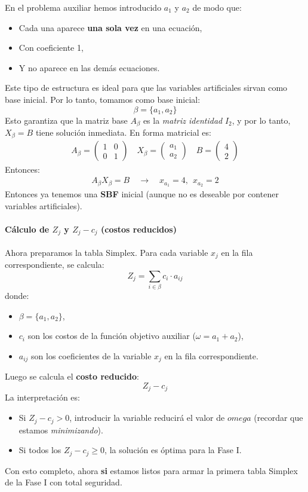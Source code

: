 En el problema auxiliar hemos introducido \(a_1\) y \(a_2\) de modo que:
\begin{itemize}
  \item Cada una aparece \textbf{una sola vez} en una ecuación,
  \item Con coeficiente 1,
  \item Y no aparece en las demás ecuaciones.
\end{itemize}
Este tipo de estructura es ideal para que las variables artificiales sirvan como base inicial. Por lo tanto, tomamos como base inicial:
\[
  \beta = \{a_1, a_2\}
\]
Esto garantiza que la matriz base \(A_\beta\) es la \textit{matriz identidad} \(I_2\), y por lo tanto, \(X_\beta = B\) tiene solución inmediata. En forma matricial es:
\begin{align*}
  A_\beta =
  \begin{pmatrix}
    1 & 0\\
    0 & 1
  \end{pmatrix}
  \quad
  X_\beta =
  \begin{pmatrix}
    a_1\\
    a_2
  \end{pmatrix}
  \quad
  B =
  \begin{pmatrix}
    4\\
    2
  \end{pmatrix}
\end{align*}
Entonces:
\begin{align*}
  A_\beta X_\beta = B \quad \rightarrow \quad x_{a_1} = 4, ~~ x_{a_2} = 2
\end{align*}
Entonces ya tenemos una \textbf{SBF} inicial (aunque no es deseable por contener variables artificiales).

\paragraph{Cálculo de \(Z_j\) y \(Z_{j}-c_j\) (costos reducidos)}

Ahora preparamos la tabla Simplex. Para cada variable \(x_j\) en la fila correspondiente, se calcula:
\[
  Z_j = \sum_{i \in \beta} c_i \cdot a_{ij}
\]
donde:
\begin{itemize}
  \item \(\beta=\{a_1, a_2\}\),
  \item \(c_i\) son los costos de la función objetivo auxiliar (\(\omega = a_1 + a_2\)),
  \item \(a_{ij}\) son los coeficientes de la variable \(x_j\) en la fila correspondiente.
\end{itemize}
Luego se calcula el \textbf{costo reducido}:
\[
  Z_j - c_j
\]
La interpretación es:
\begin{itemize}
  \item Si \(Z_j - c_j > 0\), introducir la variable reducirá el valor de \(omega\) (recordar que estamos \textit{minimizando}).
  \item Si todos los \(Z_j - c_j \geq 0\), la solución es óptima para la Fase I.
\end{itemize}
Con esto completo, ahora \textbf{si} estamos listos para armar la primera tabla Simplex de la Fase I con total seguridad.


